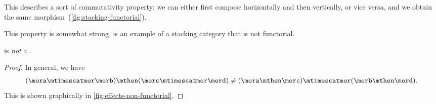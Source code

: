 %
This describes a sort of commutativity property: we can either first compose horizontally and then vertically, or vice versa, and we obtain the same morphism~(\cref{fig:stacking-functorial}).

This property is somewhat strong.
\Effects is an example of a stacking category that is not functorial.

\begin{lemma}
    \label{lem:effects-not-functorial}
    \Effects is \emph{not} a .
\end{lemma}

\begin{proof}
    In general, we have
    \begin{equation}
        (\mora \mtimescatmor \morb )
        \mthen (\morc \mtimescatmor \mord )
        \neq
        (\mora \mthen \morc ) \mtimescatmor (\morb \mthen \mord ).
    \end{equation}
    This is shown graphically in \cref{fig:effects-non-functorial}.
\end{proof}

\begin{figure*}[h]
    \centering
    \hfill
    \hfill
    \hfill
    \caption{Proof that \Effects is not a  category by showing that
        the two morphisms above have different representations in~\SetL.}
    \label{fig:effects-non-functorial}
\end{figure*}


